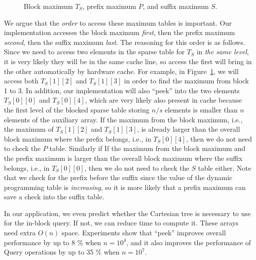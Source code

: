 

\begin{figure}[!thb]
  \centering {}  \caption{Block maximum $T_S$, prefix maximum $P$, and suffix
    maximum $S$.}
  \label{fig:compressed-sp-opt}
\end{figure}

We argue that the {\em order} to access these maximum tables is
important.  Our implementation accesses the block maximum {\em first},
then the prefix maximum {\em second}, then the suffix maximum {\em
last}.  The reasoning for this order is as follows.  Since we need to
access two elements in the sparse table for $T_S$ in {\em the same
level}, it is very likely they will be in the same cache line, so access
the first will bring in the other automatically by hardware cache.  For
example, in Figure~\ref{fig:compressed-sp-opt}, we will access both
$T_{S}[1][2]$ and $T_{S}[1][3]$ in order to find the maximum from block
1 to 3.  In addition, our implementation will also ``peek'' into the two
elements $T_{S}[0][0]$ and $T_{S}[0][4]$, which are very likely also
present in cache because the first level of the blocked sparse table
storing $n/s$ elements is smaller than $n$ elements of the auxiliary
array.   If the maximum from the block maximum, i.e., the maximum of
$T_{S}[1][2]$ and $T_{S}[1][3]$, is already larger than the overall
block maximum where the prefix belongs, i.e., in $T_{S}[0][4]$, then we
do not need to check the $P$ table.  Similarly if If the maximum from
the block maximum and the prefix maximum is larger than the overall
block maximum where the suffix belongs, i.e., in $T_{S}[0][0]$, then we
do not need to check the $S$ table either.  Note that we check for the
prefix before the suffix since the value of the dynamic programming
table is {\em increasing}, so it is more likely that a prefix maximum
can save a check into the suffix table.




  
In our application, we even predict whether the Cartesian tree is
necessary to use for the in-block query. If not, we can reduce time to
compute it. These arrays need extra $O(n)$ space.  Experiments show that
``peek'' improves overall performance by up to 8 \% when $n = 10^4$, and
it also improves the performance of {\sc Query} operations by up to 35
\% when $n = 10^7$.

